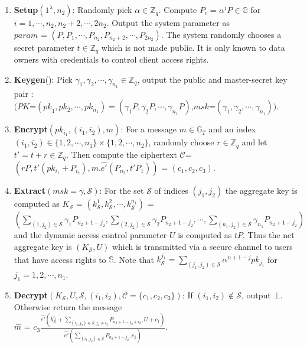 \begin{enumerate}
 \item \textbf{Setup}$(1^{\lambda},n_2)$: Randomly pick $\alpha \in \mathbb{Z}_q$. Compute $P_i$ = ${\alpha^{i}}P \in \mathbb{G}$ for $i = 1,\cdots,n_2,n_2+2,\cdots,2n_2$. Output the system parameter as\\
 $param$ = $(P,P_1,\cdots,P_{n_2},P_{n_2+2},\cdots,P_{2n_2})$. The system randomly chooses a secret parameter $t \in \mathbb{Z}_q$ which is not made public. It is only known to data owners with credentials to control client access rights.
 \item \textbf{Keygen}(): Pick $\gamma_1,\gamma_2,\cdots,\gamma_{n_1} \in \mathbb{Z}_q$, output the public and master-secret key pair :\\ $(PK$=$({pk}_1,pk_{2},\cdots,pk_{n_1})=(\gamma_1P,\gamma_2P,\cdots,\gamma_{n_1}P)$,$msk$=$(\gamma_1,\gamma_2,\cdots,\gamma_{n_1}))$.
 \item \textbf{Encrypt}$(pk_{i_1},(i_1,i_2),m)$: For a message $m \in \mathbb{G}_T$ and an index $(i_1,i_2) \in \{1,2,\cdots,n_1\}\times\{1,2,\cdots,n_2\}$, randomly choose $r\in\mathbb{Z}_q$ and let $t'=t+r \in\mathbb{Z}_q$. Then compute the ciphertext $\mathcal{C}$=$(rP,t'{(pk_{i_1}+P_{i_2})},m.\hat{e'}(P_{n_2},t'P_1))$ = $(c_1,c_2,c_3)$.
 \item \textbf{Extract}$(msk=\gamma,\mathcal{S})$: For the set $\mathcal{S}$ of indices $(j_1,j_2)$ the aggregate key is computed as $K_{\mathcal{S}}$ = $(k^{1}_{\mathcal{S}},k^{2}_{\mathcal{S}},\cdots,k^{n_1}_{\mathcal{S}})$ =\\$(\sum_{(1,j_2)\in\mathcal{S}}{\gamma_{1}}P_{n_2+1-j_2},\sum_{(2,j_2)\in\mathcal{S}}{\gamma_{2}}P_{n_2+1-j_2},\cdots,\sum_{(n_1,j_2)\in\mathcal{S}}{\gamma_{n_1}}P_{n_2+1-j_2})$\\ and the dynamic access control parameter $U$ is computed as $tP$. Thus the net aggregate key is $(K_{\mathcal{S}},U)$ which is transmitted via a secure channel to users that have access rights to $\mathbb{S}$. Note that  $k^{j_1}_{\mathcal{S}}=\sum_{(j_1,j_2)\in\mathcal{S}}\alpha^{n+1-j}pk_{j_1}$ for $j_1=1,2,\cdots,n_1$. 
 \item \textbf{Decrypt}$(K_{\mathcal{S}}, U, \mathcal{S},(i_1,i_2),\mathcal{C}=\{c_1,c_2,c_3\})$: If $(i_1,i_2)\notin\mathcal{S}$, output $\bot$. Otherwise return the message\\ $\hat{m}$ = $c_3\frac{\hat{e'}(k^{i_1}_{\mathcal{S}}+\sum_{(i_1,j_2)\in\mathcal{S},j_2\neq i_2}P_{n_2+1-j_2+i_2},U+c_1)}{\hat{e'}(\sum_{(i_1,j_2)\in\mathcal{S}}P_{n_2+1-j_2},c_2)}$. 
\end{enumerate}

